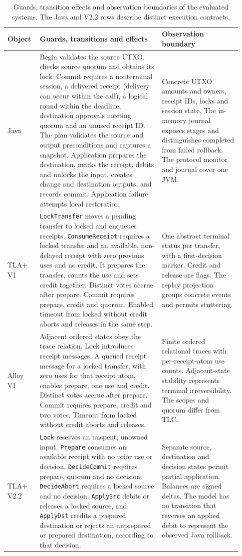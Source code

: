 \begin{table}[htbp]
\centering
\footnotesize
\caption{Guards, transition effects and observation boundaries of the evaluated
systems. The Java and V2.2 rows describe distinct execution contracts.}
\label{tab:three-levels}
\begin{tabular}{@{}p{0.12\linewidth}p{0.49\linewidth}p{0.32\linewidth}@{}}
\hline
Object & Guards, transitions and effects & Observation boundary \\
\hline
Java &
Begin validates the source UTXO, checks source quorum and obtains its lock. Commit requires a
nonterminal session, a delivered receipt (delivery can occur within the call),
a logical round within the deadline, destination approvals meeting quorum
and an unused receipt ID. The plan validates the source and output
preconditions and captures a snapshot. Application prepares the destination,
marks the receipt, debits and unlocks the input, creates change and destination
outputs, and records commit. Application failure attempts local restoration. &
Concrete UTXO amounts and owners, receipt IDs, locks and session state.
The in-memory journal exposes stages and distinguishes completed from failed
rollback. The protocol monitor and journal cover one JVM. \\
TLA+ V1 &
\texttt{LockTransfer} moves a pending transfer to locked and enqueues receipts.
\texttt{ConsumeReceipt} requires a locked transfer and an available, non-delayed
receipt with zero previous uses and no credit. It prepares the transfer,
counts the use and sets credit together. Distinct votes accrue after prepare.
Commit requires prepare, credit and quorum. Enabled timeout from locked
without credit aborts and releases in the same step. &
One abstract terminal status per transfer, with a first-decision marker.
Credit and release are flags. The replay projection groups concrete events
and permits stuttering. \\
Alloy V1 &
Adjacent ordered states obey the trace relation. Lock introduces receipt
messages. A queued receipt message for a locked transfer, with zero uses
for that receipt atom, enables prepare, one use and credit. Distinct votes
accrue after prepare. Commit requires prepare, credit and two votes.
Timeout from locked without credit aborts and releases. &
Finite ordered relational traces with per-receipt-atom use counts.
Adjacent-state stability represents terminal irreversibility. The scopes
and quorum differ from TLC. \\
TLA+ V2.2 &
\texttt{Lock} reserves an unspent, unowned input. \texttt{Prepare} consumes
an available receipt with no prior use or decision. \texttt{DecideCommit}
requires prepare, quorum and no decision. \texttt{DecideAbort} requires
a locked source and no decision. \texttt{ApplySrc} debits or releases a
locked source, and \texttt{ApplyDst} credits a prepared destination or
rejects an unprepared or prepared destination, according to that decision. &
Separate source, destination and decision states permit partial application.
Balances are signed deltas. The model has no transition that reverses an
applied debit to represent the observed Java rollback. \\
\hline
\end{tabular}
\end{table}

